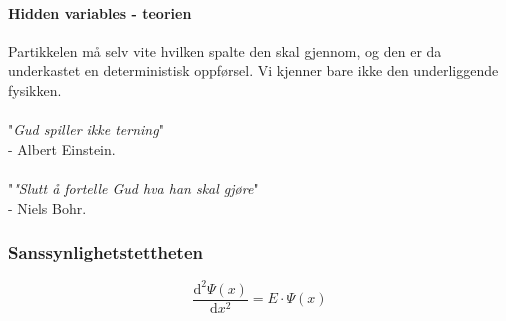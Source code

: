 \paragraph{Hidden variables - teorien}
Partikkelen må selv vite hvilken spalte den skal gjennom, og den er da underkastet en deterministisk oppførsel. Vi kjenner bare ikke den underliggende fysikken. \\\\
"\textit{Gud spiller ikke terning}" \\- Albert Einstein. \\\\
"\textit{"Slutt å fortelle Gud hva han skal gjøre}" \\- Niels Bohr. 

\subsubsection{Sanssynlighetstettheten}
\[
\frac{\mathrm{d}^2 Ψ(x)}{\mathrm{d}x^2} = E ⋅ Ψ (x)
\]

